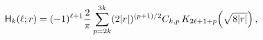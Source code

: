 \[{\sf H}_{k}(\ell;r)=(-1)^{\ell+1}\frac{2}{\pi}\sum_{p=2k}^{3k}(2|r|)^{(p+1)/2}%
C_{k,p}\mathop{K_{2\ell+1+p}\/}\nolimits\!\left(\sqrt{8|r|}\right),\]